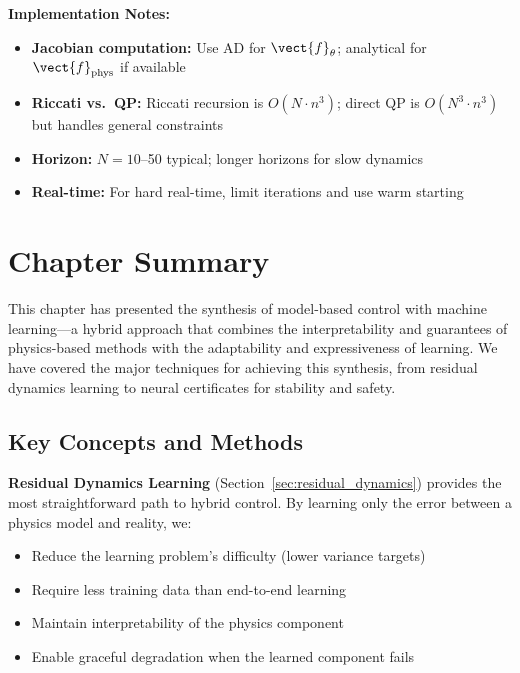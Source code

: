 \textbf{Implementation Notes:}
\begin{itemize}
    \item \textbf{Jacobian computation:} Use AD for $\vect{f}_\theta$; analytical for $\vect{f}_{\text{phys}}$ if available
    \item \textbf{Riccati vs.\ QP:} Riccati recursion is $O(N \cdot n^3)$; direct QP is $O(N^3 \cdot n^3)$ but handles general constraints
    \item \textbf{Horizon:} $N = 10$--50 typical; longer horizons for slow dynamics
    \item \textbf{Real-time:} For hard real-time, limit iterations and use warm starting
\end{itemize}

\section{Chapter Summary}
\label{sec:chapter_summary}

This chapter has presented the synthesis of model-based control with machine learning---a hybrid approach that combines the interpretability and guarantees of physics-based methods with the adaptability and expressiveness of learning. We have covered the major techniques for achieving this synthesis, from residual dynamics learning to neural certificates for stability and safety.

\subsection{Key Concepts and Methods}

\textbf{Residual Dynamics Learning} (Section~\ref{sec:residual_dynamics}) provides the most straightforward path to hybrid control. By learning only the error between a physics model and reality, we:
\begin{itemize}
    \item Reduce the learning problem's difficulty (lower variance targets)
    \item Require less training data than end-to-end learning
    \item Maintain interpretability of the physics component
    \item Enable graceful degradation when the learned component fails
\end{itemize}

